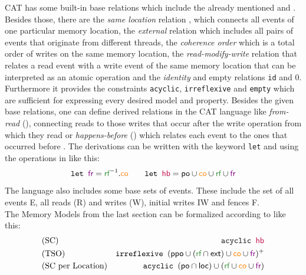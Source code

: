 \documentclass[a4paper,twoside,12pt, english]{article}
\begin{document}
CAT has some built-in base relations which include the already mentioned \po{} and \rf. Besides those, there are the \textit{same location} relation \loc, which connects all events of one particular memory location, the \textit{external} relation \ext{} which includes all pairs of events that originate from different threads, the \textit{coherence order} \co{} which is a total order of writes on the same memory location, the \textit{read-modify-write} relation \rmw{} that relates a read event with a write event of the same memory location that can be interpreted as an atomic operation and the \textit{identity} and empty relations \texttt{id} and $0$. Furthermore it provides the constraints \texttt{acyclic}, \texttt{irreflexive} and \texttt{empty} which are sufficient for expressing every desired model and property. 
Besides the given base relations, one can define derived relations in the CAT language like \textit{from-read} (\fr), connecting reads to those writes that occur after the write operation from which they read or \textit{happens-before} (\hb) which relates each event to the ones that occurred before \cite{Lam78}. The derivations can be written with the keyword \texttt{let} and using the operations in  like this:
\[\texttt{let } \fr = \text{\rf}^{-1}\text{.\co} \qquad \texttt{let } \text{\hb}=\textsf{po}\cup \text{\co}\cup \text{\rf} \cup \text{\fr}\]
The language also includes some base sets of events. These include the set of all events E, all reads (R) and writes (W), initial writes IW and fences F. \\
The Memory Models from the last section can be formalized according to \cite{Gru+26,Kou+24} like this:
\begin{align*}
&\text{(SC) } \hfill &\texttt{acyclic }\hb \\
&\text{(TSO) } \hfill &\texttt{irreflexive }(\textsf{ppo} \cup (\rf \cap \ext) \cup \co \cup \fr)^+ \\
&\text{(SC per Location)} \hfill &\texttt{acyclic } (\po \cap \loc) \cup (\rf \cup \co \cup \fr)
\end{align*}  
\end{document}
